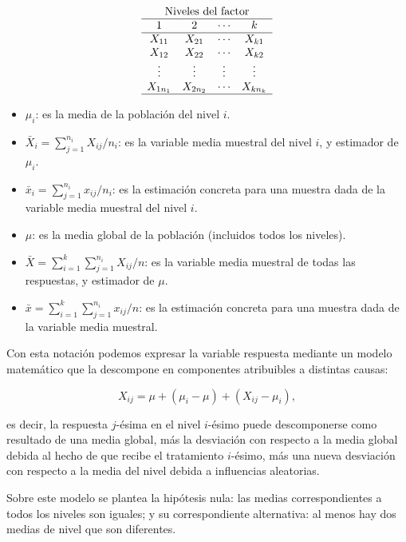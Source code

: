 \documentclass[
  a4paper,
]{scrreport}
\providecommand{\tightlist}{%
  \setlength{\itemsep}{0pt}\setlength{\parskip}{0pt}}\usepackage{longtable,booktabs,array}
\theoremstyle{plain}
\theoremstyle{definition}
\theoremstyle{definition}
\theoremstyle{remark}
\begin{document}
\[
\begin{array}{c}
\mbox{Niveles del factor}\\
\begin{array}{cccc}
\hline
1 & 2 & \cdots & k\\
\hline
X_{11} & X_{21} & \cdots & X_{k1}\\
X_{12} & X_{22} & \cdots & X_{k2}\\
\vdots & \vdots & \vdots & \vdots\\
X_{1n_1} & X_{2n_2} & \cdots & X_{kn_k}\\
\hline
\end{array}
\end{array}
\]

\begin{itemize}
\tightlist
\item
  \(\mu_i\): es la media de la población del nivel \(i\).
\item
  \(\bar X_i = \sum_{j = 1}^{n_i} X_{ij}/n_i\): es la variable media
  muestral del nivel \(i\), y estimador de \(\mu_i\).
\item
  \(\bar x_i = \sum_{j = 1}^{n_i} x_{ij}/n_i\): es la estimación
  concreta para una muestra dada de la variable media muestral del nivel
  \(i\).
\item
  \(\mu\): es la media global de la población (incluidos todos los
  niveles).
\item
  \(\bar X  = \sum_{i = 1}^k \sum_{j = 1}^{n_i } X_{ij}/n\): es la
  variable media muestral de todas las respuestas, y estimador de
  \(\mu\).
\item
  \(\bar x  = \sum_{i = 1}^k \sum_{j = 1}^{n_i }x_{ij}/n\): es la
  estimación concreta para una muestra dada de la variable media
  muestral.
\end{itemize}

Con esta notación podemos expresar la variable respuesta mediante un
modelo matemático que la descompone en componentes atribuibles a
distintas causas:

\[
X_{ij} = \mu + (\mu_i-\mu) + (X_{ij}-\mu_i),
\]

es decir, la respuesta \(j\)-ésima en el nivel \(i\)-ésimo puede
descomponerse como resultado de una media global, más la desviación con
respecto a la media global debida al hecho de que recibe el tratamiento
\(i\)-ésimo, más una nueva desviación con respecto a la media del nivel
debida a influencias aleatorias.

Sobre este modelo se plantea la hipótesis nula: las medias
correspondientes a todos los niveles son iguales; y su correspondiente
alternativa: al menos hay dos medias de nivel que son diferentes.
\end{document}
